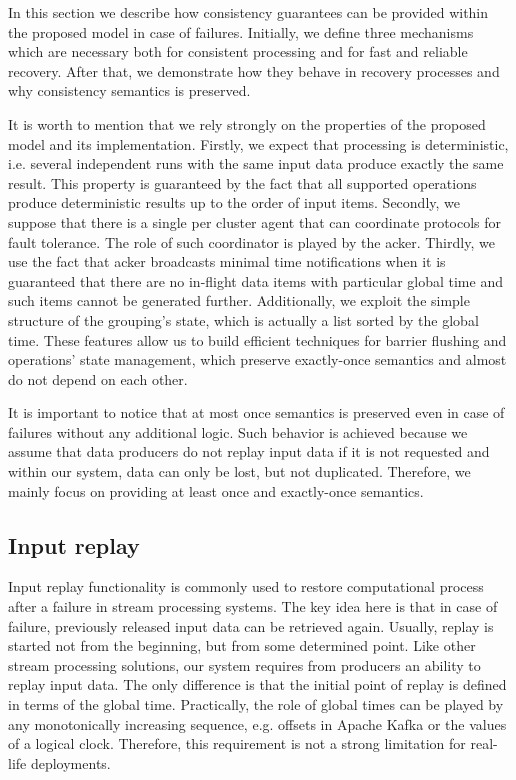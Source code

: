 
\label {fs-consistency-seciton}

In this section we describe how consistency guarantees can be provided within the proposed model in case of failures. Initially, we define three mechanisms which are necessary both for consistent processing and for fast and reliable recovery. After that, we demonstrate how they behave in recovery processes and why consistency semantics is preserved.

It is worth to mention that we rely strongly on the properties of the proposed model and its implementation. Firstly, we expect that processing is deterministic, i.e. several independent runs with the same input data produce exactly the same result. This property is guaranteed by the fact that all supported operations produce deterministic results up to the order of input items. Secondly, we suppose that there is a single per cluster agent that can coordinate protocols for fault tolerance. The role of such coordinator is played by the acker. Thirdly, we use the fact that acker broadcasts minimal time notifications when it is guaranteed that there are no in-flight data items with particular global time and such items cannot be generated further. Additionally, we exploit the simple structure of the grouping's state, which is actually a list sorted by the global time. These features allow us to build efficient techniques for barrier flushing and operations' state management, which preserve exactly-once semantics and almost do not depend on each other.

It is important to notice that at most once semantics is preserved even in case of failures without any additional logic. Such behavior is achieved because we assume that data producers do not replay input data if it is not requested and within our system, data can only be lost, but not duplicated. Therefore, we mainly focus on providing at least once and exactly-once semantics.

\subsection{Input replay}
Input replay functionality is commonly used to restore computational process after a failure in stream processing systems. The key idea here is that in case of failure, previously released input data can be retrieved again. Usually, replay is started not from the beginning, but from some determined point. Like other stream processing solutions, our system requires from producers an ability to replay input data. The only difference is that the initial point of replay is defined in terms of the global time. Practically, the role of global times can be played by any monotonically increasing sequence, e.g. offsets in Apache Kafka or the values of a logical clock. Therefore, this requirement is not a strong limitation for real-life deployments.

